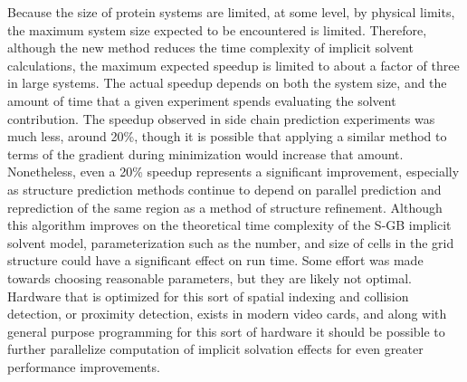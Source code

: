 Because the size of protein systems are limited, at some level, by physical limits, the maximum system size expected to be encountered is limited.
Therefore, although the new method reduces the time complexity of implicit solvent calculations, the maximum expected speedup is limited to about a factor of three in large systems.
The actual speedup depends on both the system size, and the amount of time that a given experiment spends evaluating the solvent contribution.
The speedup observed in side chain prediction experiments was much less, around 20\%, though it is possible that applying a similar method to terms of the gradient during minimization would increase that amount.
Nonetheless, even a 20\%  speedup represents a significant improvement, especially as structure prediction methods continue to depend on parallel prediction and reprediction of the same region as a method of structure refinement\cite{goldfeld2013loop}.
Although this algorithm improves on the theoretical time complexity of the S-GB implicit solvent model, parameterization such as the number, and size of cells in the grid structure could have a significant effect on run time.
Some effort was made towards choosing reasonable parameters, but they are likely not optimal.
Hardware that is optimized for this sort of spatial indexing and collision detection, or proximity detection, exists in modern video cards, and along with general purpose programming for this sort of hardware it should be possible to further parallelize computation of implicit solvation effects for even greater performance improvements\cite{harris2008cuda}.

